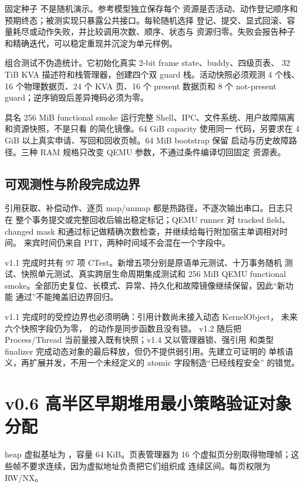 固定种子  不是随机演示。参考模型独立保存每个
资源是否活动、动作登记顺序和预期终态；被测实现只暴露公共接口。每轮随机选择
登记、提交、显式回滚、容量耗尽或动作失败，并比较调用次数、顺序、状态与
资源归零。失败会报告种子和精确迭代，可以稳定重现并沉淀为单元样例。

组合测试不伪造统计。它初始化真实 2-bit frame state、buddy、四级页表、
32 TiB KVA 描述符和栈管理器，创建四个双 guard 栈。活动快照必须观测
4 个栈、16 个物理数据页、24 个 KVA 页、16 个 present 数据页和 8 个
not-present guard；逆序销毁后差异掩码必须为零。

具名 256 MiB functional smoke 运行完整 Shell、IPC、文件系统、用户故障隔离
和资源快照，不是只看  的简化镜像。64 GiB capacity 使用同一
代码，另要求在 4 GiB 以上真实申请、写回和回收页帧。64 MiB bootstrap 保留
启动与历史故障路径。三种 RAM 规格只改变 QEMU 参数，不通过条件编译切回固定
资源表。

\subsection{可观测性与阶段完成边界}

引用获取、补偿动作、逐页 map/unmap 都是热路径，不逐次输出串口。日志只在
整个事务提交或完整回收后输出稳定标记；QEMU runner 对 tracked field、
changed mask 和通过标记做精确次数检查，并继续给每行附加宿主单调相对时间。
来宾时间仍来自 PIT，两种时间域不会混在一个字段中。

v1.1 完成时共有 97 项 CTest。新增五项分别是原语单元测试、十万事务随机
测试、快照单元测试、真实跨层生命周期集成测试和 256 MiB QEMU functional
smoke。全部历史复位、长模式、异常、持久化和故障镜像继续保留，因此“新功能
通过”不能掩盖旧边界回归。

v1.1 完成时的受控边界也必须明确：引用计数尚未接入动态 KernelObject，
未来六个快照字段仍为零， 的动作是同步函数且没有锁。
v1.2 随后把 Process/Thread 当前量接入既有快照；v1.4 又以管理器锁、强引用
和类型 finalizer 完成动态对象的最后释放，但仍不提供弱引用。先建立可证明的
单核语义，再扩展并发，不用一个未经定义的 atomic 字段制造“已经线程安全”
的错觉。

\section{v0.6 高半区早期堆用最小策略验证对象分配}

heap 虚拟基址为 ，容量 64 KiB。页表管理器为
16 个虚拟页分别取得物理帧；这些帧不要求连续，因为虚拟地址负责把它们组织成
连续区间。每页权限为 RW/NX。

